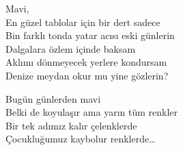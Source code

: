 \noindent\newline
Mavi, \\
En güzel tablolar için bir dert sadece \\
Bin farklı tonda yatar acısı eski günlerin \\
Dalgalara özlem içinde baksam \\
Aklımı dönmeyecek yerlere kondursam \\
Denize meydan okur mu yine gözlerin?

\noindent\newline
Bugün günlerden mavi \\
Belki de koyulaşır ama yarın tüm renkler \\
Bir tek adımız kalır çelenklerde \\
Çocukluğumuz kaybolur renklerde…